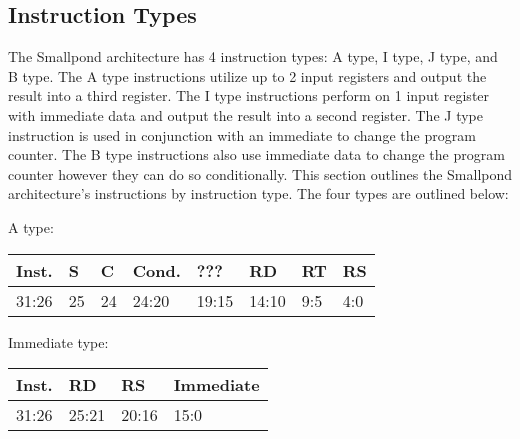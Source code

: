 \documentclass[12pt]{article}
\begin{document}
\subsection{Instruction Types}
    The Smallpond architecture has 4 instruction types: A type, I type, J type, and B type. The A type instructions utilize up to 2 input registers and output the result into a third register. The I type instructions perform on 1 input register with immediate data and output the result into a second register. The J type instruction is used in conjunction with an immediate to change the program counter. The B type instructions also use immediate data to change the program counter however they can do so conditionally. This section outlines the Smallpond architecture's instructions by instruction type. The four types are outlined below:\\

    \begin{center}
        A type:\\
        \vspace{1em}
        \begin{tabular}{ |p{1.8cm}|p{.3cm}|p{.3cm}|p{1.5cm}|p{1.5cm}|p{1.5cm}|p{1.5cm}|p{1.5cm}| }
            \hline
            \textbf{Inst.} & \textbf{S}& \textbf{C} & \textbf{Cond.} & ??? & \textbf{RD} & \textbf{RT} & \textbf{RS}\\
            \hline
            31:26& 25 & 24 & 24:20 & 19:15 & 14:10 & 9:5 & 4:0\\
            \hline
        \end{tabular}
    \end{center}
    
    \begin{center}
        Immediate type:\\
        \vspace{1em}
        \begin{tabular}{ |p{1.8cm}|p{1.5cm}|p{1.5cm}|p{6.8cm}| }
            \hline
            \textbf{Inst.} & \textbf{RD} &  \textbf{RS} & \textbf{Immediate}\\
            \hline
            31:26& 25:21 & 20:16 &15:0\\
            \hline
        \end{tabular}
    \end{center}
    
\end{document}
